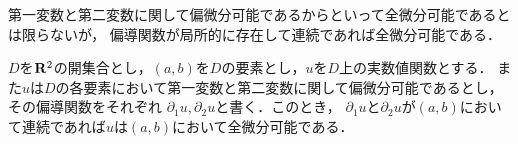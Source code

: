 	第一変数と第二変数に関して偏微分可能であるからといって全微分可能であるとは限らないが，
	偏導関数が局所的に存在して連続であれば全微分可能である．
	
	\begin{screen}
		\begin{thm}[偏導関数が連続であれば全微分可能]
		\label{thm:continuously_partially_differentiable_then_totally_differentiable}
			$D$を$\mathbf{R}^2$の開集合とし，$(a,b)$を$D$の要素とし，$u$を$D$上の実数値関数とする．
			また$u$は$D$の各要素において第一変数と第二変数に関して偏微分可能であるとし，その偏導関数をそれぞれ
			$\partial_1 u,\partial_2 u$と書く．このとき，
			$\partial_1 u$と$\partial_2 u$が$(a,b)$において連続であれば$u$は$(a,b)$において全微分可能である．
		\end{thm}
	\end{screen}
	
